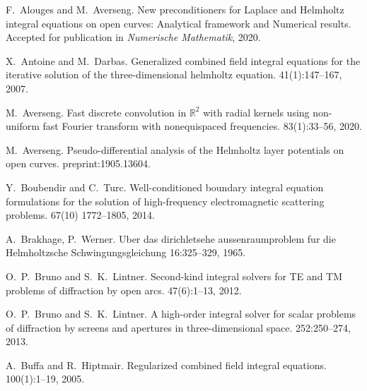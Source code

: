 \documentclass[]{article}
\begin{document}
\begin{scriptsize}
	\begin{thebibliography}{0}
		
		F.~Alouges and M.~Averseng.
		\newblock New preconditioners for Laplace and Helmholtz integral equations on open curves: Analytical framework and Numerical results. 
		\newblock Accepted for publication in {\em Numerische Mathematik}, 2020.
		
		X.~Antoine and M.~Darbas.
		\newblock Generalized combined field integral equations for the iterative
		solution of the three-dimensional helmholtz equation.
		41(1):147--167, 2007.
		
		M.~Averseng.
		\newblock Fast discrete convolution in $\mathbb {R}^{2} $ with radial kernels using non-uniform fast Fourier transform with nonequispaced frequencies. 
		 83(1):33--56, 2020.
		
		M.~Averseng. 
		\newblock Pseudo-differential analysis of the Helmholtz layer potentials on open curves. 
		 preprint:1905.13604.
		
		Y.~Boubendir and C.~Turc.
		\newblock Well-conditioned boundary integral equation formulations for the solution of high-frequency electromagnetic scattering problems.
		 67(10) 1772--1805, 2014.
		
		A.~Brakhage, P.~Werner.
		\newblock Uber das dirichletsehe aussenraumproblem fur die Helmholtzsche Schwingungsgleichung
		 16:325–329, 1965.
		
		O.~P.~Bruno and S.~K.~Lintner.
		\newblock Second-kind integral solvers for TE and TM problems of diffraction by open arcs.
		 47(6):1--13, 2012.
		
		O.~P.~Bruno and S.~K.~Lintner.
		A high-order integral solver for scalar problems of diffraction by screens and apertures in three-dimensional space.
		 252:250--274, 2013.
		
		A.~Buffa and R.~Hiptmair.
		\newblock Regularized combined field integral equations.
		 100(1):1--19, 2005.	
		

\end{thebibliography}
\end{scriptsize}
\end{document}
